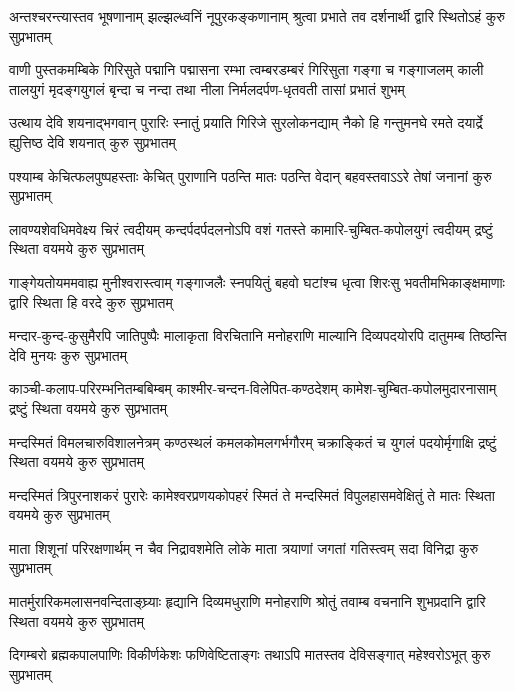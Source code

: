 \fourlineindentedshloka
{अन्तश्चरन्त्यास्तव भूषणानाम्}
{झल्झल्ध्वनिं नूपुरकङ्कणानाम्}
{श्रुत्वा प्रभाते तव दर्शनार्थी}
{द्वारि स्थितोऽहं कुरु सुप्रभातम्}

\fourlineindentedshloka
{वाणी पुस्तकमम्बिके गिरिसुते पद्मानि पद्मासना}
{रम्भा त्वम्बरडम्बरं गिरिसुता गङ्गा च गङ्गाजलम्}
{काली तालयुगं मृदङ्गयुगलं बृन्दा च नन्दा तथा}
{नीला निर्मलदर्पण-धृतवती तासां प्रभातं शुभम्}

\fourlineindentedshloka
{उत्थाय देवि शयनाद्भगवान् पुरारिः}
{स्नातुं प्रयाति गिरिजे सुरलोकनद्याम्}
{नैको हि गन्तुमनघे रमते दयार्द्रे}
{ह्युत्तिष्ठ देवि शयनात् कुरु सुप्रभातम्}

\fourlineindentedshloka
{पश्याम्ब केचित्फलपुष्पहस्ताः}
{केचित् पुराणानि पठन्ति मातः}
{पठन्ति वेदान् बहवस्तवाऽऽरे}
{तेषां जनानां कुरु सुप्रभातम्}

\fourlineindentedshloka
{लावण्यशेवधिमवेक्ष्य चिरं त्वदीयम्}
{कन्दर्पदर्पदलनोऽपि वशं गतस्ते}
{कामारि-चुम्बित-कपोलयुगं त्वदीयम्}
{द्रष्टुं स्थिता वयमये कुरु सुप्रभातम्}

\fourlineindentedshloka
{गाङ्गेयतोयममवाह्य मुनीश्वरास्त्वाम्}
{गङ्गाजलैः स्नपयितुं बहवो घटांश्च}
{धृत्वा शिरःसु भवतीमभिकाङ्क्षमाणाः}
{द्वारि स्थिता हि वरदे कुरु सुप्रभातम्}

\fourlineindentedshloka
{मन्दार-कुन्द-कुसुमैरपि जातिपुष्पैः}
{मालाकृता विरचितानि मनोहराणि}
{माल्यानि दिव्यपदयोरपि दातुमम्ब}
{तिष्ठन्ति देवि मुनयः कुरु सुप्रभातम्}

\fourlineindentedshloka
{काञ्ची-कलाप-परिरम्भनितम्बबिम्बम्}
{काश्मीर-चन्दन-विलेपित-कण्ठदेशम्}
{कामेश-चुम्बित-कपोलमुदारनासाम्}
{द्रष्टुं स्थिता वयमये कुरु सुप्रभातम्}

\fourlineindentedshloka
{मन्दस्मितं विमलचारुविशालनेत्रम्}
{कण्ठस्थलं कमलकोमलगर्भगौरम्}
{चक्राङ्कितं च युगलं पदयोर्मृगाक्षि}
{द्रष्टुं स्थिता वयमये कुरु सुप्रभातम्}

\fourlineindentedshloka
{मन्दस्मितं त्रिपुरनाशकरं पुरारेः}
{कामेश्वरप्रणयकोपहरं स्मितं ते}
{मन्दस्मितं विपुलहासमवेक्षितुं ते}
{मातः स्थिता वयमये कुरु सुप्रभातम्}

\fourlineindentedshloka
{माता शिशूनां परिरक्षणार्थम्}
{न चैव निद्रावशमेति लोके}
{माता त्रयाणां जगतां गतिस्त्वम्}
{सदा विनिद्रा कुरु सुप्रभातम्}

\fourlineindentedshloka
{मातर्मुरारिकमलासनवन्दिताङ्घ्र्याः}
{हृद्यानि दिव्यमधुराणि मनोहराणि}
{श्रोतुं तवाम्ब वचनानि शुभप्रदानि}
{द्वारि स्थिता वयमये कुरु सुप्रभातम्}

\fourlineindentedshloka
{दिगम्बरो ब्रह्मकपालपाणिः}
{विकीर्णकेशः फणिवेष्टिताङ्गः}
{तथाऽपि मातस्तव देविसङ्गात्}
{महेश्वरोऽभूत् कुरु सुप्रभातम्}

